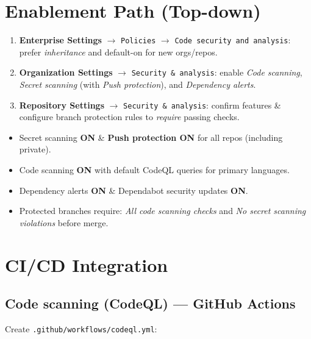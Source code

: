 \documentclass[10pt,a4paper]{article}
\begin{document}
\section{Enablement Path (Top-down)}

\begin{enumerate}
  \item \textbf{Enterprise Settings} $\rightarrow$ \texttt{Policies} $\rightarrow$ \texttt{Code security and analysis}: prefer \emph{inheritance} and default-on for new orgs/repos.
  \item \textbf{Organization Settings} $\rightarrow$ \texttt{Security \& analysis}: enable \emph{Code scanning}, \emph{Secret scanning} (with \emph{Push protection}), and \emph{Dependency alerts}.
  \item \textbf{Repository Settings} $\rightarrow$ \texttt{Security \& analysis}: confirm features \& configure branch protection rules to \emph{require} passing checks.
\end{enumerate}

\begin{ghascallout}
\begin{itemize}
  \item Secret scanning \textbf{ON} \& \textbf{Push protection ON} for all repos (including private).
  \item Code scanning \textbf{ON} with default CodeQL queries for primary languages.
  \item Dependency alerts \textbf{ON} \& Dependabot security updates \textbf{ON}.
  \item Protected branches require: \emph{All code scanning checks} and \emph{No secret scanning violations} before merge.
\end{itemize}
\end{ghascallout}
\clearpage

\section{CI/CD Integration}

\subsection*{Code scanning (CodeQL) --- GitHub Actions}
\noindent Create \texttt{.github/workflows/codeql.yml}:
\end{document}
